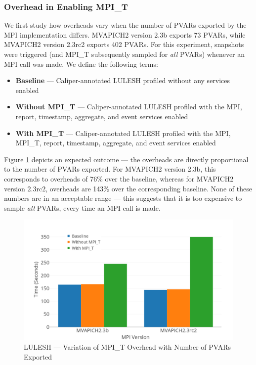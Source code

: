 \subsubsection{Overhead in Enabling MPI\_T}
We first study how overheads vary when the number of PVARs exported by the MPI implementation differs. MVAPICH2 version 2.3b exports 73 PVARs, while MVAPICH2 version 2.3rc2 exports 402 PVARs. For this experiment, snapshots were triggered (and MPI\_T subsequently sampled for \textit{all} PVARs) whenever an MPI call was made. We define the following terms:
\begin{itemize}
\item \textbf{Baseline} --- Caliper-annotated LULESH profiled without any services enabled
\item \textbf{Without MPI\_T} --- Caliper-annotated LULESH profiled with the MPI, report, timestamp, aggregate, and event services enabled
\item \textbf{With MPI\_T} --- Caliper-annotated LULESH profiled with the MPI, MPI\_T, report, timestamp, aggregate, and event services enabled
\end{itemize}
Figure \ref{fig:cali-overhead-version} depicts an expected outcome --- the overheads are directly proportional to the number of PVARs exported. For MVAPICH2 version 2.3b, this corresponds to overheads of 76\% over the baseline, whereas for MVAPICH2 version 2.3rc2, overheads are 143\% over the corresponding baseline. None of these numbers are in an acceptable range --- this suggests that it is too expensive to sample \textit{all} PVARs, every time an MPI call is made.
\begin{center}
	\begin{figure}[bp!]
         \centering
  \captionsetup{justification=centering}
		\includegraphics[scale=0.8, width=\columnwidth, keepaspectratio]{figures/CALIPER_overheads_version}
		\caption{LULESH --- Variation of MPI\_T Overhead with Number of PVARs Exported}
		\label{fig:cali-overhead-version}
	\end{figure}
\end{center}

